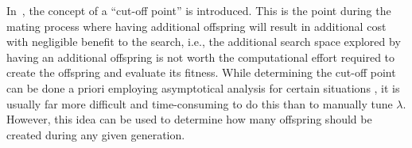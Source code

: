 In~\cite{hansen:onsizing}, the concept of a ``cut-off point'' is introduced.  This is the point during the mating process where having additional offspring will result in additional cost with negligible benefit to the search, i.e., the additional search space explored by having an additional offspring is not worth the computational effort required to create the offspring and evaluate its fitness. While determining the cut-off point can be done a priori employing asymptotical analysis for certain situations \cite{hansen:onsizing}, it is usually far more difficult and time-consuming to do this than to manually tune $\lambda$. However, this idea can be used to determine how many offspring should be created during any given generation.